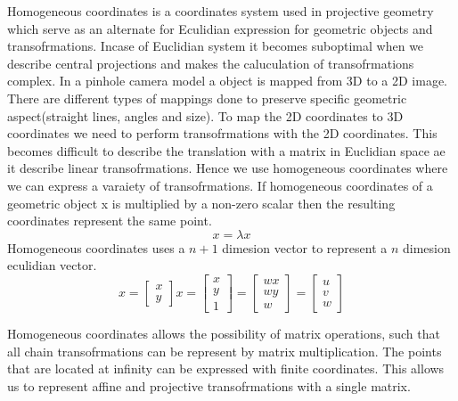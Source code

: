 Homogeneous coordinates is a coordinates system used in projective geometry which serve as an alternate for Eculidian expression for geometric objects and transofrmations. Incase of Euclidian system it becomes suboptimal when we describe central projections and makes the caluculation of transofrmations complex. In a pinhole camera model a object is mapped from 3D to a 2D image. There are different types of mappings done to preserve specific geometric aspect(straight lines, angles and size). To map the 2D coordinates to 3D coordinates we need to perform transofrmations with the 2D coordinates. This becomes difficult to describe the translation with a matrix in Euclidian space ae it describe linear transofrmations. Hence we use homogeneous coordinates where we can express a varaiety of transofrmations. If homogeneous coordinates of a geometric object x is multiplied by a non-zero scalar then the resulting coordinates represent the same point.
\begin{equation}
	x = \lambda x
\end{equation}
Homogeneous coordinates uses a $n +1$ dimesion vector to represent a $n$ dimesion eculidian vector. 
\begin{equation}
x = 
	\begin{bmatrix}
		x \\
		y 
	\end{bmatrix}
x = 
	\begin{bmatrix}
		x \\
		y \\
		1
	\end{bmatrix}
	= 
	\begin{bmatrix}
		wx \\
		wy \\
		w
	\end{bmatrix}
	= 
	\begin{bmatrix}
		u \\
		v \\
		w
	\end{bmatrix}
\end{equation}

Homogeneous coordinates allows the possibility of matrix operations, such that all chain transofrmations can be represent by matrix multiplication. The points that are located at infinity can be expressed with finite coordinates. This allows us to represent affine and projective transofrmations with a single matrix.

